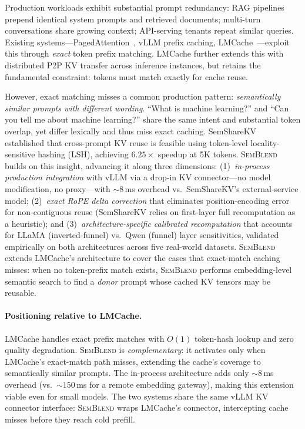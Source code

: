 \documentclass[10pt,twocolumn]{article}
\newcommand{\semblend}{\textsc{SemBlend}\xspace}
\begin{document}
Production workloads exhibit substantial prompt redundancy: RAG
pipelines prepend identical system prompts and retrieved documents;
multi-turn conversations share growing context; API-serving tenants
repeat similar queries. Existing systems---PagedAttention~\cite{pagedattention},
vLLM prefix caching, LMCache~\cite{lmcache}---exploit this through
\emph{exact} token prefix matching. LMCache further extends this with
distributed P2P KV transfer across inference instances, but retains the
fundamental constraint: tokens must match exactly for cache reuse.

However, exact matching misses a common production pattern:
\emph{semantically similar prompts with different wording}. ``What is
machine learning?'' and ``Can you tell me about machine learning?''
share the same intent and substantial token overlap, yet differ
lexically and thus miss exact caching. SemShareKV~\cite{semsharekv}
established that cross-prompt KV reuse is feasible using token-level
locality-sensitive hashing (LSH), achieving $6.25\times$ speedup at
5K tokens. \semblend builds on this insight, advancing it along three
dimensions: (1)~\emph{in-process production integration} with vLLM via
a drop-in KV connector---no model modification, no proxy---with ${\sim}8$\,ms
overhead vs.\ SemShareKV's external-service model; (2)~\emph{exact RoPE
delta correction} that eliminates position-encoding error for non-contiguous
reuse (SemShareKV relies on first-layer full recomputation as a heuristic);
and (3)~\emph{architecture-specific calibrated recomputation} that accounts
for LLaMA (inverted-funnel) vs.\ Qwen (funnel) layer sensitivities, validated
empirically on both architectures across five real-world datasets.
\semblend extends LMCache's architecture to cover the cases that
exact-match caching misses: when no token-prefix match exists,
\semblend performs embedding-level semantic search to find a \emph{donor}
prompt whose cached KV tensors may be reusable.

\paragraph{Positioning relative to LMCache.}
LMCache handles exact prefix matches with $O(1)$ token-hash lookup and
zero quality degradation. \semblend is \emph{complementary}: it activates
only when LMCache's exact-match path misses, extending the cache's
coverage to semantically similar prompts. The in-process architecture
adds only ${\sim}8$\,ms overhead (vs.\ ${\sim}150$\,ms for a remote
embedding gateway), making this extension viable even for small models.
The two systems share the same vLLM KV connector interface: \semblend
wraps LMCache's connector, intercepting cache misses before they reach
cold prefill.
\end{document}
